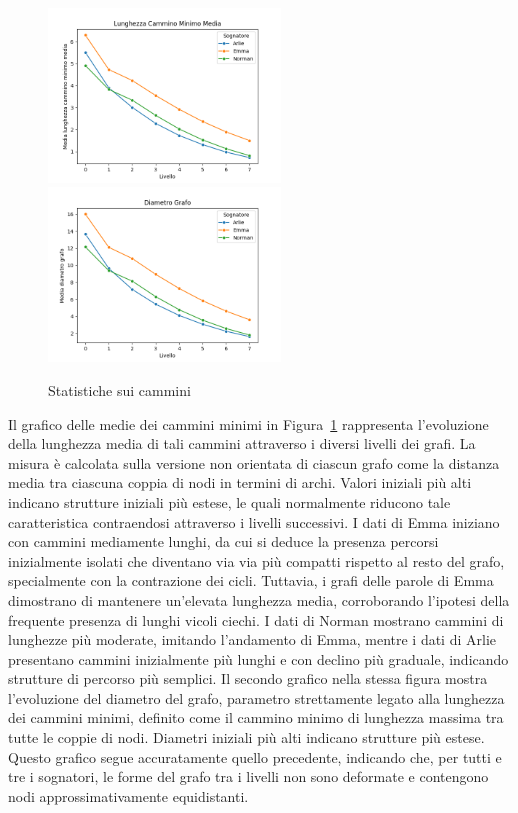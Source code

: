 \begin{figure}
    \vspace{-10pt}
    \includegraphics[width=0.55\textwidth]{Immagini/lunghezza_cammino_minimo_media}
    \includegraphics[width=0.55\textwidth]{Immagini/diametro_grafo}
    \caption{Statistiche sui cammini}\label{fig:paths}
    \vspace{-10pt}
\end{figure}

Il grafico delle medie dei cammini minimi in Figura~\ref{fig:paths} rappresenta l'evoluzione della lunghezza media di
tali cammini attraverso i diversi livelli dei grafi.
La misura è calcolata sulla versione non orientata di ciascun grafo come la distanza media tra ciascuna coppia di
nodi in termini di archi.
Valori iniziali più alti indicano strutture iniziali più estese, le quali normalmente riducono tale caratteristica
contraendosi attraverso i livelli successivi.
I dati di Emma iniziano con cammini mediamente lunghi, da cui si deduce la presenza percorsi inizialmente isolati
che diventano via via più compatti rispetto al resto del grafo, specialmente con la contrazione dei cicli.
Tuttavia, i grafi delle parole di Emma dimostrano di mantenere un'elevata lunghezza media, corroborando l'ipotesi
della frequente presenza di lunghi vicoli ciechi.
I dati di Norman mostrano cammini di lunghezze più moderate, imitando l'andamento di Emma,
mentre i dati di Arlie presentano cammini inizialmente più lunghi e con declino più graduale, indicando strutture di
percorso più semplici.
Il secondo grafico nella stessa figura mostra l'evoluzione del diametro del grafo, parametro strettamente legato
alla lunghezza dei cammini minimi, definito come il cammino minimo di lunghezza massima tra tutte le coppie di nodi.
Diametri iniziali più alti indicano strutture più estese.
Questo grafico segue accuratamente quello precedente, indicando che, per tutti e tre i sognatori, le forme del grafo
tra i livelli non sono deformate e contengono nodi approssimativamente equidistanti.

